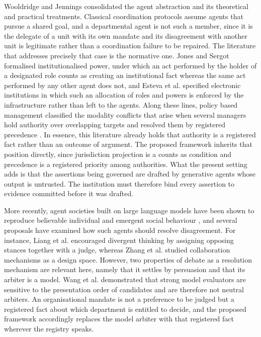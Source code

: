 \documentclass[journal]{IEEEtran}
\begin{document}
Wooldridge and Jennings \cite{wooldridge1995agents} consolidated the agent abstraction and its theoretical and practical treatments. Classical coordination protocols assume agents that pursue a shared goal, and a departmental agent is not such a member, since it is the delegate of a unit with its own mandate and its disagreement with another unit is legitimate rather than a coordination failure to be repaired. The literature that addresses precisely that case is the normative one. Jones and Sergot \cite{jones1996power} formalised institutionalised power, under which an act performed by the holder of a designated role counts as creating an institutional fact whereas the same act performed by any other agent does not, and Esteva et al. \cite{esteva2001institutions} specified electronic institutions in which such an allocation of roles and powers is enforced by the infrastructure rather than left to the agents. Along these lines, policy based management classified the modality conflicts that arise when several managers hold authority over overlapping targets and resolved them by registered precedence \cite{lupu1999conflicts}. In essence, this literature already holds that authority is a registered fact rather than an outcome of argument. The proposed framework inherits that position directly, since jurisdiction projection is a counts as condition and precedence is a registered priority among authorities. What the present setting adds is that the assertions being governed are drafted by generative agents whose output is untrusted. The institution must therefore bind every assertion to evidence committed before it was drafted.

More recently, agent societies built on large language models have been shown to reproduce believable individual and emergent social behaviour \cite{park2023generative}, and several proposals have examined how such agents should resolve disagreement. For instance, Liang et al. \cite{liang2024debate} encouraged divergent thinking by assigning opposing stances together with a judge, whereas Zhang et al. \cite{zhang2024collaboration} studied collaboration mechanisms as a design space. However, two properties of debate as a resolution mechanism are relevant here, namely that it settles by persuasion and that its arbiter is a model. Wang et al. \cite{wang2024unfair} demonstrated that strong model evaluators are sensitive to the presentation order of candidates and are therefore not neutral arbiters. An organisational mandate is not a preference to be judged but a registered fact about which department is entitled to decide, and the proposed framework accordingly replaces the model arbiter with that registered fact wherever the registry speaks.
\end{document}
